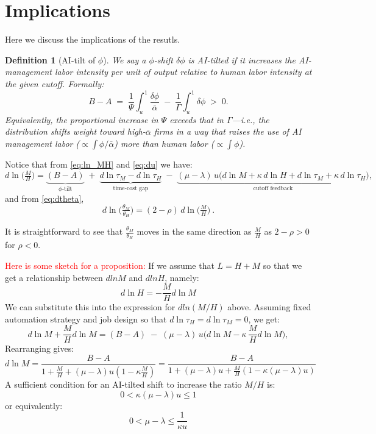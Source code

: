\documentclass[english]{article}
\newtheorem{definition}{Definition}
\begin{document}
\section*{Implications}

Here we discuss the implications of the resutls.


\newpage


\begin{definition}[AI-tilt of $\phi$]
We say a $\phi$-shift $\delta\phi$ is \emph{AI-tilted} if it increases the \emph{AI-management labor intensity per unit of output} relative to human labor intensity at the given cutoff. Formally:
\[
B-A 
\;=\;   
\frac{1}{\Psi}\int_u^1\frac{\delta\phi}{\bar\alpha} \;-\; \frac{1}{\Gamma}\int_u^1\delta\phi 
\;>\; 
0.
\]
Equivalently, the proportional increase in $\Psi$ exceeds that in $\Gamma$---i.e., the distribution shifts weight toward high-$\bar\alpha$ firms in a way that raises the use of AI management labor ($\propto \int\phi/\bar\alpha$) more than human labor ($\propto \int\phi$).
\end{definition}



Notice that from \eqref{eq:ln_MH} and \eqref{eq:du} we have:
\[
\boxed{
d\ln\!\Big(\tfrac{M}{H}\Big)
=\underbrace{(B-A)}_{\text{$\phi$-tilt}}
\;+\;\underbrace{d\ln\tau_M-d\ln\tau_H}_{\text{time-cost gap}}
\;-\;\underbrace{(\mu-\lambda)\,u\Big(d\ln M+\kappa\,d\ln H+d\ln\tau_M+\kappa\,d\ln\tau_H\Big)}_{\text{cutoff feedback}},
}
\]
and from \eqref{eq:dtheta},
\[
\boxed{\ d\ln\!\Big(\tfrac{\theta_M}{\theta_H}\Big)=(2-\rho)\,d\ln\!\Big(\tfrac{M}{H}\Big)\ .\ }
\]

It is straightforward to see that $\frac{\theta_M}{\theta_H}$ moves in the same direction as $\frac{M}{H}$ as $2-\rho>0$ for $\rho<0$.



\textcolor{red}{Here is some sketch for a proposition:}
If we assume that $L = H + M$ so that we get a relationship between $dlnM$ and $dlnH$, namely:
\[
d\ln H = - \frac{M}{H} d\ln M
\]
We can substitute this into the expression for $dln(M/H)$ above. 
Assuming fixed automation strategy and job design so that $d\ln\tau_H =d\ln\tau_M=0$, we get:
\[
d\ln M + \frac{M}{H} d\ln M
=
(B-A)
\;-\;
(\mu-\lambda)\,u\Big(d\ln M-\kappa\,\frac{M}{H} d\ln M\Big),
\]
Rearranging gives:
\[
d\ln M 
= 
\frac{B - A}{1+\frac{M}{H}+(\mu-\lambda)u(1 - \kappa \frac{M}{H})}
=
\frac{B - A}{1+(\mu-\lambda)u + \frac{M}{H}(1 - \kappa (\mu-\lambda)u)}
\]
A sufficient condition for an AI-tilted shift to increase the ratio $M/H$ is:
\[
0 < \kappa (\mu-\lambda)u \leq 1
\]
or equivalently:
\[
\boxed{
0 < \mu-\lambda \leq \frac{1}{\kappa u}
}
\]
\end{document}
